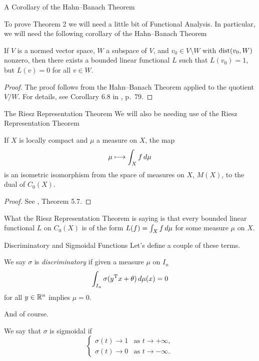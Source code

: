 \documentclass[11pt,letterpaper]{beamer}
\begin{document}
\begin{frame}{A Corollary of the Hahn--Banach Theorem}

  To prove Theorem 2 we will need a little bit of Functional Analysis. In
  particular, we will need the following corollary of the Hahn--Banach Theorem
  \begin{corollary}
    If $V$ is a normed vector space, $W$ a subspace of $V$, and $v_0\in
    V\setminus W$ with $\operatorname{dist}(v_0,W)$ nonzero, then there exists a
    bounded linear functional $L$ such that $L(v_0)=1$, but $L(v)=0$ for all
    $v\in W$.
  \end{corollary}
  \begin{proof}
    The proof follows from the Hahn--Banach Theorem applied to the quotient
    $V/W$. For details, see Corollary 6.8 in \cite{conway}, p.\ 79.
  \end{proof}
\end{frame}

\begin{frame}{The Riesz Representation Theorem}
  We will also be needing use of the Riesz Representation Theorem
  \begin{theorem}
    If $X$ is locally compact and $\mu$ a measure on $X$, the map
    \[
      \mu\longmapsto\int_X f\mathop{}\!d\mu
    \]
    is an isometric isomorphism from the space of measures on $X$, $M(X)$, to
    the dual of $C_0(X)$.
  \end{theorem}
  \begin{proof}
    See \cite{conway}, Theorem 5.7.
  \end{proof}
  What the Riesz Representation Theorem is saying is that every bounded linear
  functional $L$ on $C_0(X)$ is of the form $L(f)=\int_X f\mathop{}\!d \mu$ for some
  measure $\mu$ on $X$.
\end{frame}

\begin{frame}{Discriminatory and Sigmoidal Functions}
  Let's define a couple of these terms.
  \begin{definition}
    We say $\sigma$ is \emph{discriminatory} if given a measure $\mu$ on $I_n$
    \[
      \int_{I_n}\sigma( y^{\mathrm{T}} x+\theta)\mathop{}\!d\mu( x)=0
    \]
    for all $ y\in\mathbb{R}^n$ implies $\mu=0$.
  \end{definition}
  And of course.
  \begin{definition}
    We say that $\sigma$ is sigmoidal if
    \[
      \begin{cases}
        \sigma(t)\to 1&\text{as }t\to +\infty,\\
        \sigma(t)\to 0&\text{as }t\to -\infty.
      \end{cases}
    \]
  \end{definition}
\end{frame}
\end{document}
